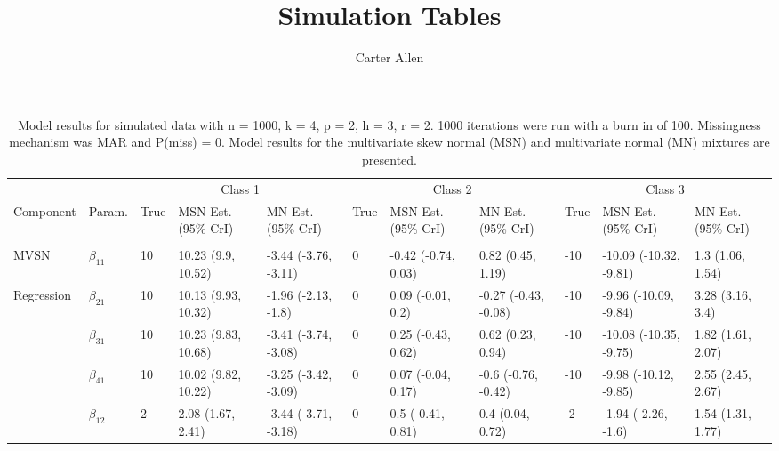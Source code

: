 \documentclass[]{article}
\title{Simulation Tables}
\author{Carter Allen}
\date{}
\begin{document}
\maketitle

\begin{landscape}\begin{table}[t]

\caption{\label{tab:unnamed-chunk-5}Model results for simulated data with n = 1000, k = 4, p = 2, h = 3, r = 2. 1000 iterations were run with a burn in of 100. Missingness mechanism was MAR and P(miss) = 0. Model results for the multivariate skew normal (MSN) and multivariate normal (MN) mixtures are presented.}
\centering
\fontsize{7}{9}\selectfont
\begin{tabular}{lllllllllll}
\toprule
\multicolumn{2}{c}{ } & \multicolumn{3}{c}{Class 1} & \multicolumn{3}{c}{Class 2} & \multicolumn{3}{c}{Class 3} \\
\cmidrule(l{3pt}r{3pt}){3-5} \cmidrule(l{3pt}r{3pt}){6-8} \cmidrule(l{3pt}r{3pt}){9-11}
Component & Param. & True & MSN Est. (95\% CrI) & MN Est. (95\% CrI)  & True & MSN Est. (95\% CrI) & MN Est. (95\% CrI) & True & MSN Est. (95\% CrI) & MN Est. (95\% CrI)\\
\midrule
\addlinespace[0.3em]
\multicolumn{11}{l}{\textbf{ }}\\
\hspace{1em}MVSN & $\beta_{11}$ & 10 & 10.23 (9.9, 10.52) & -3.44 (-3.76, -3.11) & 0 & -0.42 (-0.74, 0.03) & 0.82 (0.45, 1.19) & -10 & -10.09 (-10.32, -9.81) & 1.3 (1.06, 1.54)\\
\hspace{1em}Regression & $\beta_{21}$ & 10 & 10.13 (9.93, 10.32) & -1.96 (-2.13, -1.8) & 0 & 0.09 (-0.01, 0.2) & -0.27 (-0.43, -0.08) & -10 & -9.96 (-10.09, -9.84) & 3.28 (3.16, 3.4)\\
\hspace{1em} & $\beta_{31}$ & 10 & 10.23 (9.83, 10.68) & -3.41 (-3.74, -3.08) & 0 & 0.25 (-0.43, 0.62) & 0.62 (0.23, 0.94) & -10 & -10.08 (-10.35, -9.75) & 1.82 (1.61, 2.07)\\
\hspace{1em} & $\beta_{41}$ & 10 & 10.02 (9.82, 10.22) & -3.25 (-3.42, -3.09) & 0 & 0.07 (-0.04, 0.17) & -0.6 (-0.76, -0.42) & -10 & -9.98 (-10.12, -9.85) & 2.55 (2.45, 2.67)\\
\hspace{1em} & $\beta_{12}$ & 2 & 2.08 (1.67, 2.41) & -3.44 (-3.71, -3.18) & 0 & 0.5 (-0.41, 0.81) & 0.4 (0.04, 0.72) & -2 & -1.94 (-2.26, -1.6) & 1.54 (1.31, 1.77)\\

\end{tabular}
\end{table}
\end{landscape}
\end{document}

